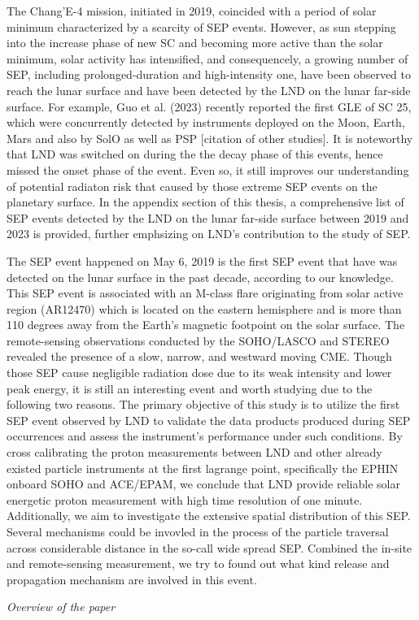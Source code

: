 


The Chang'E-4 mission, initiated in 2019, coincided with a period of solar minimum characterized by a scarcity of \ac{SEP} events. However, as sun stepping into the increase phase of new \ac{SC} and becoming more active than the solar minimum, solar activity has intensified, and consequencely, a growing number of \acs{SEP}, including prolonged-duration and high-intensity one, have been observed to reach the lunar surface and have been detected by the \ac{LND} on the lunar far-side surface. For example, Guo et al. (2023) recently reported the first \ac{GLE} of \ac{SC} 25, which were concurrently detected by instruments deployed on the Moon, Earth, Mars and also by \ac{SolO} as well as \ac{PSP} [citation of other studies]. It is noteworthy that \ac{LND} was switched on during the the decay phase of this events, hence missed the onset phase of the event. Even so, it still improves our understanding of potential radiaton risk that caused by those extreme \ac{SEP} events on the planetary surface.
In the appendix section of this thesis, a comprehensive list of \ac{SEP} events detected by the \ac{LND} on the lunar far-side surface between 2019 and 2023 is provided, further emphsizing on \ac{LND}'s contribution to the study of \acs{SEP}.


The \ac{SEP} event happened on May 6, 2019 is the first \ac{SEP} event that have was detected on the lunar surface in the past decade, according to our knowledge. 
This \ac{SEP} event is associated with an M-class flare originating from solar active region (AR12470) which is located on the eastern hemisphere and is more than 110 degrees away from the Earth's magnetic footpoint on the solar surface. The remote-sensing observations conducted by the \ac{SOHO}/\ac{LASCO} and \ac{STEREO} revealed the presence of a slow, narrow, and westward moving \ac{CME}. 
Though those \acs{SEP} cause negligible radiation dose due to its weak intensity and lower peak energy, it is still an interesting event and worth studying due to the following two reasons.
The primary objective of this study is to utilize the first \ac{SEP} event observed by \ac{LND} to validate the data products produced during \ac{SEP} occurrences and assess the instrument's performance under such conditions. By cross calibrating the proton measurements between \ac{LND} and other already existed particle instruments at the first lagrange point, specifically the \ac{EPHIN} onboard \ac{SOHO} and \ac{ACE}/\ac{EPAM}, we conclude that \ac{LND} provide reliable solar energetic proton measurement with high time resolution of one minute.
Additionally, we aim to investigate the extensive spatial distribution of this \ac{SEP}. Several mechanisms could be invovled in the process of the particle traversal across considerable distance in the so-call wide spread \acs{SEP}. Combined the in-site and remote-sensing measurement, we try to found out what kind release and propagation mechanism are involved in this event.

\textit{Overview of the paper}



